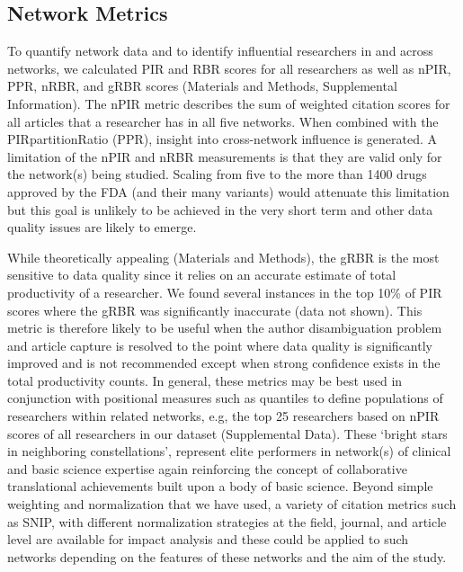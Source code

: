\documentclass[10pt,letterpaper]{article}
\begin{document}
\subsection*{Network Metrics} To quantify network data and to identify influential researchers in and across networks, we calculated PIR and RBR scores for all researchers as well as nPIR, PPR, nRBR, and gRBR scores (Materials and Methods, Supplemental Information). The nPIR metric describes the sum of weighted citation scores for all articles that a researcher has in all five networks. When combined with the PIRpartitionRatio (PPR), insight into cross-network influence is generated.  A limitation of the nPIR and nRBR measurements is that they are valid only for the network(s) being studied. Scaling from five to the more than 1400 drugs approved by the FDA (and their many variants) would attenuate this limitation\cite{bibKinch} but this goal is unlikely to be achieved in the very short term and other data quality issues are likely to emerge. 

While theoretically appealing (Materials and Methods), the gRBR is the most sensitive to data quality since it relies on an accurate estimate of total productivity of a researcher. We found several instances in the top 10\% of PIR scores where the gRBR was significantly inaccurate (data not shown). This metric is therefore likely to be useful when the author disambiguation problem and article capture is resolved to the point where data quality is significantly improved and is not recommended except when strong confidence exists in the total productivity counts. In general, these metrics may be best used in conjunction with positional measures such as quantiles to define populations of researchers within related networks, e.g, the top 25 researchers based on nPIR scores of all researchers in our dataset (Supplemental Data). These `bright stars in neighboring constellations', represent elite performers in network(s) of clinical and basic science expertise again reinforcing the concept of collaborative translational achievements built upon a body of basic science. Beyond simple weighting and normalization that we have used, a variety of citation metrics such as SNIP\cite{bibWaltman}, with different normalization strategies at the field, journal, and article level are available for impact analysis and these could be applied to such networks depending on the features of these networks and the aim of the study\cite{bibIoannidis}. 
\end{document}
